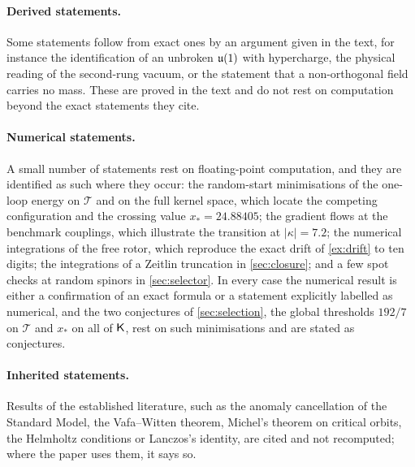 \paragraph{Derived statements.} Some statements follow from exact ones by an argument given in the text, for instance the identification of an unbroken $\mathfrak{u}(1)$ with
hypercharge, the physical reading of the second-rung vacuum, or the statement that a non-orthogonal field carries no mass. These are proved in the text and do not rest on
computation beyond the exact statements they cite.

\paragraph{Numerical statements.} A small number of statements rest on floating-point computation, and they are identified as such where they occur: the random-start
minimisations of the one-loop energy on $\mathcal T$ and on the full kernel space, which locate the competing configuration and the crossing value $x_*=24.88405$; the gradient
flows at the benchmark couplings, which illustrate the transition at $|\kappa|=7.2$; the numerical integrations of the free rotor, which reproduce the exact drift of
\cref{ex:drift} to ten digits; the integrations of a Zeitlin truncation in \cref{sec:closure}; and a few spot checks at random spinors in \cref{sec:selector}. In every case the
numerical result is either a confirmation of an exact formula or a statement explicitly labelled as numerical, and the two conjectures of \cref{sec:selection}, the global
thresholds $192/7$ on $\mathcal T$ and $x_*$ on all of $\mathsf K$, rest on such minimisations and are stated as conjectures.

\paragraph{Inherited statements.} Results of the established literature, such as the anomaly cancellation of the Standard Model, the Vafa--Witten theorem, Michel's theorem
on critical orbits, the Helmholtz conditions or Lanczos's identity, are cited and not recomputed; where the paper uses them, it says so.
